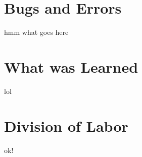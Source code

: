 \documentclass[pdftex, 11pt]{article}
\begin{document}
\section{Bugs and Errors}

hmm what goes here

\section{What was Learned}

lol

\section{Division of Labor}

ok!
\end{document}
